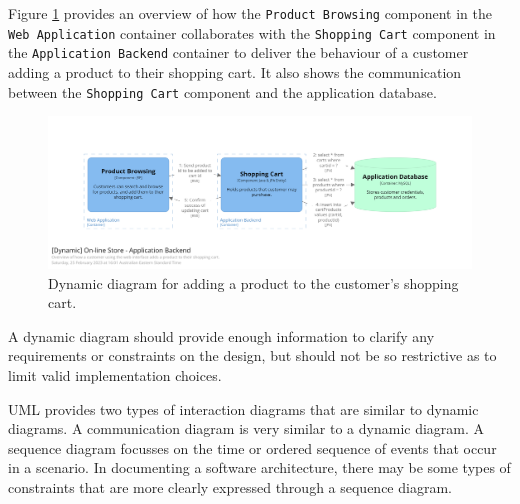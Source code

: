 Figure \ref{fig:c4_dynamic} provides an overview of how the
\texttt{Product Browsing} component in the \texttt{Web Application} container collaborates with the
\texttt{Shopping Cart} component in the \texttt{Application Backend} container
to deliver the behaviour of a customer adding a product to their shopping cart.
It also shows the communication between the \texttt{Shopping Cart} component and the application database.

\begin{figure}[h!]
    \centering
    \includegraphics[trim=175 220 197 185,clip,width=\textwidth]{images/c4/add_to_cart_dynamic_diagram.png}
    \caption{Dynamic diagram for adding a product to the customer's shopping cart.}
    \label{fig:c4_dynamic}
\end{figure}

\noindent
A dynamic diagram should provide enough information to clarify any requirements or constraints on the design,
but should not be so restrictive as to limit valid implementation choices.

UML provides two types of interaction diagrams that are similar to dynamic diagrams.
A communication diagram is very similar to a dynamic diagram.
A sequence diagram focusses on the time or ordered sequence of events that occur in a scenario.
In documenting a software architecture,
there may be some types of constraints that are more clearly expressed through a sequence diagram.

